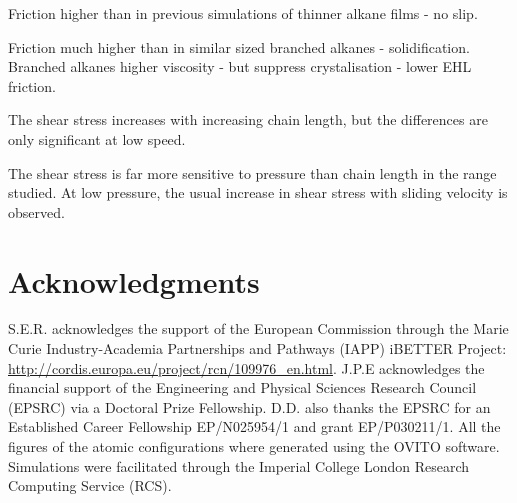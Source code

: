 \documentclass[aps,prb,reprint,superscriptaddress, a4paper]{revtex4-1}
\begin{document}
Friction higher than in previous simulations of thinner alkane films - no slip.

Friction much higher than in similar sized branched alkanes - solidification. Branched alkanes higher viscosity - but suppress crystalisation - lower EHL friction.

The shear stress increases with increasing chain length, but the differences are only significant at low speed.

The shear stress is far more sensitive to pressure than chain length in the range studied. At low pressure, the usual increase in shear stress with sliding velocity is observed. 

\section*{Acknowledgments}

S.E.R. acknowledges the support of the European Commission through the Marie Curie Industry-Academia Partnerships and Pathways (IAPP) iBETTER Project: \url{http://cordis.europa.eu/project/rcn/109976_en.html}. J.P.E acknowledges the financial support of the Engineering and Physical Sciences Research Council (EPSRC) via a Doctoral Prize Fellowship. D.D. also thanks the EPSRC for an Established Career Fellowship EP/N025954/1 and grant EP/P030211/1. All the figures of the atomic configurations where generated using the OVITO\cite{Stukowski2010b} software. Simulations were facilitated through the Imperial College London Research Computing Service (RCS).

\end{document}
